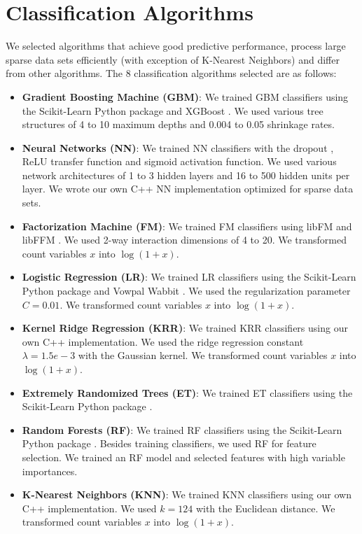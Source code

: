 \section{Classification Algorithms}
We selected algorithms that achieve good predictive performance, process large sparse data sets efficiently (with exception of K-Nearest Neighbors) and differ from other algorithms.  The 8 classification algorithms selected are as follows:
\begin{itemize}
\setlength\itemsep{0em}
\item \textbf{Gradient Boosting Machine (GBM)}: We trained GBM classifiers using the Scikit-Learn Python package \cite{scikit-learn} and XGBoost \cite{chen2015xgboost}.  We used various tree structures of 4 to 10 maximum depths and 0.004 to 0.05 shrinkage rates.
\item \textbf{Neural Networks (NN)}: We trained NN classifiers with the dropout \cite{srivastava2014dropout}, ReLU transfer function and sigmoid activation function.  We used various network architectures of 1 to 3 hidden layers and 16 to 500 hidden units per layer.  We wrote our own C++ NN implementation optimized for sparse data sets.  
\item \textbf{Factorization Machine (FM)}: We trained FM classifiers using libFM \cite{rendle2012factorization} and libFFM \cite{libffm}.  We used 2-way interaction dimensions of 4 to 20.  We transformed count variables $x$ into $\log{(1 + x)}$.
\item \textbf{Logistic Regression (LR)}: We trained LR classifiers using the Scikit-Learn Python package \cite{scikit-learn} and Vowpal Wabbit \cite{langford2007vowpal}.  We used the regularization parameter $C=0.01$.  We transformed count variables $x$ into $\log{(1 + x)}$.
\item \textbf{Kernel Ridge Regression (KRR)}: We trained KRR classifiers using our own C++ implementation.  We used the ridge regression constant $\lambda=1.5e-3$ with the Gaussian kernel.  We transformed count variables $x$ into $\log{(1 + x)}$.
\item \textbf{Extremely Randomized Trees (ET)}: We trained ET classifiers using the Scikit-Learn Python package \cite{scikit-learn}.
\item \textbf{Random Forests (RF)}: We trained RF classifiers using the Scikit-Learn Python package \cite{scikit-learn}.  Besides training classifiers, we used RF for feature selection.  We trained an RF model and selected features with high variable importances.
\item \textbf{K-Nearest Neighbors (KNN)}: We trained KNN classifiers using our own C++ implementation.  We used $k=124$ with the Euclidean distance.  We transformed count variables $x$ into $\log{(1 + x)}$.
\end{itemize}